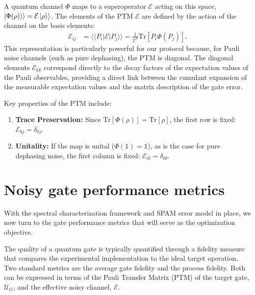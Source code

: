 \documentclass[%
 reprint,
superscriptaddress,
 amsmath,amssymb,
 aps,
pra,
]{revtex4-2}
\newcommand{\qk}[1]{{\color{OliveGreen}#1}}
\begin{document}
A quantum channel $\Phi$ maps to a superoperator $\mathcal{E}$ acting on this space, $\ket{\Phi(\rho)}\rangle=\mathcal{E}\ket{\rho}\rangle$. The elements of the PTM $\mathcal{E}$ are defined by the action of the channel on the basis elements:
\begin{align}
    \mathcal{E}_{ij} &= \langle\langle P_i | \mathcal{E} | P_j \rangle\rangle = \frac{1}{2^{N}}\text{Tr}\left[P_i \Phi(P_j)\right].
\end{align}
This representation is particularly powerful for our protocol because, for Pauli noise channels (such as pure dephasing), the PTM is diagonal. The diagonal elements $\mathcal{E}_{kk}$ correspond directly to the decay factors of the expectation values of the Pauli observables, providing a direct link between the cumulant expansion of the measurable expectation values and the matrix description of the gate error.

Key properties of the PTM include:
\begin{enumerate}
    \item \textbf{Trace Preservation:} Since $\text{Tr}[\Phi(\rho)] = \text{Tr}[\rho]$, the first row is fixed: $\mathcal{E}_{0j} = \delta_{0j}$.
    \item \textbf{Unitality:} If the map is unital ($\Phi(\mathbb{1}) = \mathbb{1}$), as is the case for pure dephasing noise, the first column is fixed: $\mathcal{E}_{i0} = \delta_{i0}$.
\end{enumerate}

\section{Noisy gate performance metrics}
\label{sec::metrics}

\qk{With the spectral characterization framework and SPAM error model in place, we now turn to the gate performance metrics that will serve as the optimization objective.}

The quality of a quantum gate is typically quantified through a fidelity measure that compares the experimental implementation to the ideal target operation. Two standard metrics are the average gate fidelity and the process fidelity. Both can be expressed in terms of the Pauli Transfer Matrix (PTM) of the target gate, $\mathcal{U}_G$, and the effective noisy channel, $\mathcal{E}$.
\end{document}
